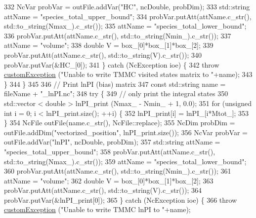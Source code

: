 \begin{DoxyCode}
332             NcVar probVar = outFile.addVar(\textcolor{stringliteral}{"HC"}, ncDouble, probDim);
333             std::string attName = \textcolor{stringliteral}{"species\_total\_upper\_bound"};
334             probVar.putAtt(attName.c\_str(), std::to\_string(Nmax\_).c\_str());
335             attName = \textcolor{stringliteral}{"species\_total\_lower\_bound"};
336             probVar.putAtt(attName.c\_str(), std::to\_string(Nmin\_).c\_str());
337             attName = \textcolor{stringliteral}{"volume"};
338             \textcolor{keywordtype}{double} V = box\_[0]*box\_[1]*box\_[2];
339             probVar.putAtt(attName.c\_str(), std::to\_string(V).c\_str());
340             probVar.putVar(&HC\_[0]);
341         \} \textcolor{keywordflow}{catch} (NcException ioe) \{
342             \textcolor{keywordflow}{throw} \hyperlink{classcustom_exception}{customException} (\textcolor{stringliteral}{"Unable to write TMMC visited states matrix to "}+name);
343         \}
344     \}
345 
346     \textcolor{comment}{// Print lnPI (bias) matrix}
347     \textcolor{keyword}{const} std::string name = fileName + \textcolor{stringliteral}{"\_lnPI.nc"};
348     \textcolor{keywordflow}{try} \{
349         \textcolor{comment}{// only print the integral states}
350         std::vector < double > lnPI\_print (Nmax\_ - Nmin\_ + 1, 0.0);
351         \textcolor{keywordflow}{for} (\textcolor{keywordtype}{unsigned} \textcolor{keywordtype}{int} i = 0; i < lnPI\_print.size(); ++i) \{
352             lnPI\_print[i] = lnPI\_[i*Mtot\_];
353         \}
354         NcFile outFile(name.c\_str(), NcFile::replace);
355         NcDim probDim = outFile.addDim(\textcolor{stringliteral}{"vectorized\_position"}, lnPI\_print.size());
356         NcVar probVar = outFile.addVar(\textcolor{stringliteral}{"lnPI"}, ncDouble, probDim);
357         std::string attName = \textcolor{stringliteral}{"species\_total\_upper\_bound"};
358         probVar.putAtt(attName.c\_str(), std::to\_string(Nmax\_).c\_str());
359         attName = \textcolor{stringliteral}{"species\_total\_lower\_bound"};
360         probVar.putAtt(attName.c\_str(), std::to\_string(Nmin\_).c\_str());
361         attName = \textcolor{stringliteral}{"volume"};
362         \textcolor{keywordtype}{double} V = box\_[0]*box\_[1]*box\_[2];
363         probVar.putAtt(attName.c\_str(), std::to\_string(V).c\_str());
364         probVar.putVar(&lnPI\_print[0]);
365     \} \textcolor{keywordflow}{catch} (NcException ioe) \{
366         \textcolor{keywordflow}{throw} \hyperlink{classcustom_exception}{customException} (\textcolor{stringliteral}{"Unable to write TMMC lnPI to "}+name);

\end{DoxyCode}
